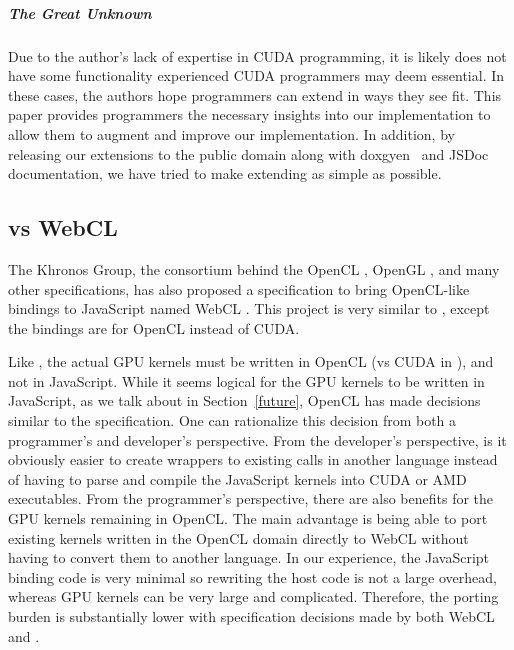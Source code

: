 \subparagraph{The Great Unknown} Due to the author's lack of expertise in CUDA
programming, it is likely \name does not have some functionality experienced
CUDA programmers may deem essential. In these cases, the authors hope
programmers can extend \name in ways they see fit.  This paper provides
programmers the necessary insights into our implementation to allow them to
augment and improve our implementation. In addition, by releasing our extensions
to the public domain along with doxgyen~\cite{doxygen} and JSDoc~\cite{JSDOC}
documentation, we have tried to make extending \name as simple as possible.



\subsection{\name vs WebCL}
\label{webCLDisc}
The Khronos Group, the consortium behind the OpenCL
\cite{openCL}, OpenGL \cite{openGL}, and many other specifications, has also
proposed a specification to bring OpenCL-like bindings to JavaScript named WebCL
\cite{webCLSpec}. This project is very similar to \name, except the bindings are for
OpenCL instead of CUDA.

Like \namens, the actual GPU kernels must be written in OpenCL (vs CUDA in
\namens), and not in JavaScript. While it seems logical for the GPU kernels to
be written in JavaScript, as we talk about in Section~\ref{future}, OpenCL has
made decisions similar to the \name specification. One can rationalize this
decision from both a programmer's and developer's perspective. From the
developer's perspective, is it obviously easier to create wrappers to existing
calls in another language instead of having to parse and compile the JavaScript
kernels into CUDA or AMD executables. From the programmer's perspective, there
are also benefits for the GPU kernels remaining in OpenCL. The main advantage is
being able to port existing kernels written in the OpenCL domain directly to
WebCL without having to convert them to another language. In our experience, the
JavaScript binding code is very minimal so rewriting the host code is not a
large overhead, whereas GPU kernels can be very large and complicated.
Therefore, the porting burden is substantially lower with specification
decisions made by both WebCL and \namens.


